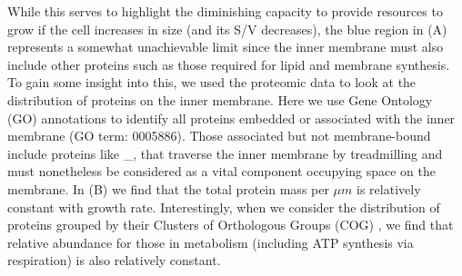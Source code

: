 While this serves to highlight the diminishing capacity to provide resources to
grow if the cell increases in size (and its S/V decreases), the blue region in
(A) represents a somewhat unachievable limit since the inner
membrane must also include other proteins such as those required for lipid and
membrane synthesis. To gain some insight into this, we used the proteomic data
to look at the distribution of proteins on the inner membrane. Here we use Gene
Ontology (GO) annotations \citep{ashburner2000,thegeneOntologyconsortium2018} to
identify all proteins embedded or associated with the inner membrane (GO term:
0005886). Those associated but not membrane-bound include proteins like _, that
traverse the inner membrane by treadmilling and must nonetheless be considered
as a vital component occupying space on the membrane. In (B)
we find that the total protein mass per $\mu m$ is relatively constant with
growth rate. Interestingly, when we consider the distribution of proteins
grouped by their Clusters of Orthologous Groups (COG) \citep{tatusov2000}, we
find that relative abundance for those in metabolism (including ATP synthesis
via respiration) is also relatively constant.




